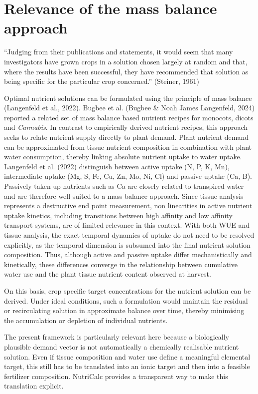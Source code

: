 \documentclass[
  letterpaper,
  DIV=11,
  numbers=noendperiod]{scrreprt}
\begin{document}
\section{Relevance of the mass balance
approach}\label{relevance-of-the-mass-balance-approach}

``Judging from their publications and statements, it would seem that
many investigators have grown crops in a solution chosen largely at
random and that, where the results have been successful, they have
recommended that solution as being specific for the particular crop
concerned.'' (Steiner, 1961)

Optimal nutrient solutions can be formulated using the principle of mass
balance (Langenfeld et al., 2022). Bugbee et al. (Bugbee \& Noah James
Langenfeld, 2024) reported a related set of mass balance based nutrient
recipes for monocots, dicots and \emph{Cannabis}. In contrast to
empirically derived nutrient recipes, this approach seeks to relate
nutrient supply directly to plant demand. Plant nutrient demand can be
approximated from tissue nutrient composition in combination with plant
water consumption, thereby linking absolute nutrient uptake to water
uptake. Langenfeld et al. (2022) distinguish between active uptake (N,
P, K, Mn), intermediate uptake (Mg, S, Fe, Cu, Zn, Mo, Ni, Cl) and
passive uptake (Ca, B). Passively taken up nutrients such as Ca are
closely related to transpired water and are therefore well suited to a
mass balance approach. Since tissue analysis represents a destructive
end point measurement, non linearities in active nutrient uptake
kinetics, including transitions between high affinity and low affinity
transport systems, are of limited relevance in this context. With both
WUE and tissue analysis, the exact temporal dynamics of uptake do not
need to be resolved explicitly, as the temporal dimension is subsumed
into the final nutrient solution composition. Thus, although active and
passive uptake differ mechanistically and kinetically, these differences
converge in the relationship between cumulative water use and the plant
tissue nutrient content observed at harvest.

On this basis, crop specific target concentrations for the nutrient
solution can be derived. Under ideal conditions, such a formulation
would maintain the residual or recirculating solution in approximate
balance over time, thereby minimising the accumulation or depletion of
individual nutrients.

The present framework is particularly relevant here because a
biologically plausible demand vector is not automatically a chemically
realisable nutrient solution. Even if tissue composition and water use
define a meaningful elemental target, this still has to be translated
into an ionic target and then into a feasible fertilizer composition.
NutriCalc provides a transparent way to make this translation explicit.
\end{document}
